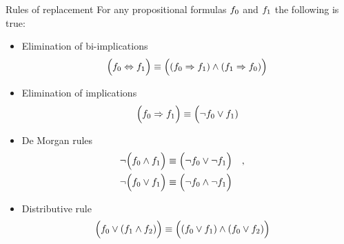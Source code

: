 \documentclass{beamer}
\begin{document}
    \begin{frame}{Rules of replacement}
        For any propositional formulas $f_{0}$ and $f_{1}$ the following is true:
        \begin{itemize}
            \item Elimination of bi-implications
            \begin{align*}
                \Big(f_{0} \Leftrightarrow f_{1}\Big)
                \equiv
                \Big((f_{0}\Rightarrow f_{1}) \land (f_{1}\Rightarrow f_{0})\Big)
            \end{align*}
            \item Elimination of implications
            \begin{align*}
                \Big(f_{0} \Rightarrow f_{1}\Big)
                \equiv
                \Big(\lnot f_{0} \lor f_{1})
            \end{align*}
            \item De Morgan rules
            \begin{align*}
                &\lnot\Big(f_{0} \land f_{1}\Big)
                \equiv
                \Big(\lnot f_{0} \lor \lnot f_{1} \Big)
                \quad, \quad\\
                &\lnot\Big(f_{0} \lor f_{1}\Big)
                \equiv
                \Big(\lnot f_{0} \land \lnot f_{1} \Big)
            \end{align*}
            \item Distributive rule
            \begin{align*}
                &\Big(f_{0} \lor (f_{1} \land f_{2})\Big)
                \equiv
                \Big((f_{0} \lor f_{1}) \land (f_{0} \lor f_{2})\Big)
            \end{align*}
        \end{itemize}


    \end{frame}
\end{document}
